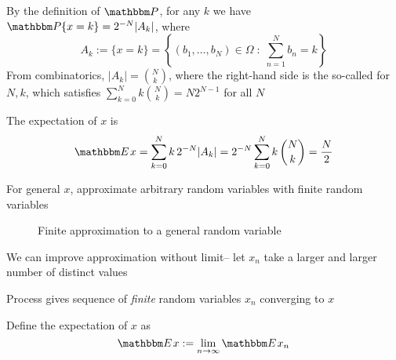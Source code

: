 \begin{frame}
    
    \vspace{2em}
    By the definition of $\PP$, for any $k$ we have
    $\PP\{x = k\} = 2^{-N} |A_k|$, where
    \begin{equation*}
         A_k :=
         \{x = k\}
         = \left\{
               (b_1, \ldots, b_N) \in \Omega
                \; : \;
                \sum_{n=1}^N b_n = k
           \right\}
    \end{equation*}
    From combinatorics, $|A_k| =
    \binom{N}{k}$, where the right-hand side is the so-called  for $N,k$, which satisfies
    $\sum_{k=0}^N k \binom{N}{k} = N 2^{N-1}$ for all $N$
    
    The expectation of $x$ is 
    \begin{equation*}
        \EE x 
        = \sum_{k=0}^N k \, 2^{-N} |A_k|
        = 2^{-N} \sum_{k=0}^N k \, \binom{N}{k} 
        = \frac{N}{2}
    \end{equation*}
\end{frame}


\begin{frame}

    \vspace{2em}
    For general $x$, approximate arbitrary random variables with finite random variables 
    
    \begin{figure}
   \begin{center}
       \scalebox{0.8}{}
    \caption{\label{f:finite_rv_approx} Finite approximation to a general random variable}
   \end{center}
    \end{figure}
    
\end{frame}


\begin{frame}
    
    \vspace{2em}
    We can improve approximation without limit-- let $x_n$ take a larger 
    and larger number of distinct values
    
    Process gives sequence of \emph{finite} random variables $x_n$
    converging to $x$
    
    Define the expectation of $x$ as
    \begin{equation*}
        \label{eq:extar}
        \EE x := \lim_{n \to \infty} \EE x_n
    \end{equation*}

\end{frame}


